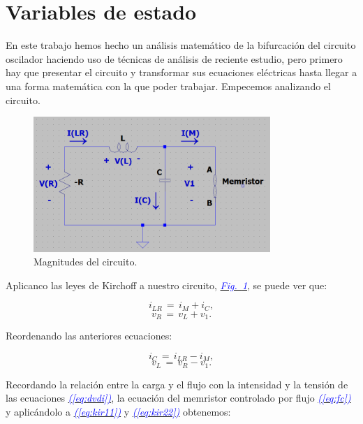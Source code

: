 \documentclass[12pt,a4paper]{report} %
\newcommand{\fref}[1]{\hyperref[#1]{\textcolor{blue}{\textit{Fig.~\ref*{#1}}}}}
\newcommand{\eref}[1]{\hyperref[#1]{\textcolor{blue}{\textit{(\ref*{#1})}}}}
\begin{document}
	\newpage
	
	\section{Variables de estado}
	\label{sec:23}
	\noindent En este trabajo hemos hecho un análisis matemático de la bifurcación del circuito oscilador haciendo uso de técnicas de análisis de reciente estudio, pero primero hay que presentar el circuito y transformar sus ecuaciones eléctricas hasta llegar a una forma matemática con la que poder trabajar. Empecemos analizando el circuito.
	
	\begin{figure}[h]
		\centering
		\includegraphics[width=0.8\textwidth]{circuito.png}
		\caption{Magnitudes del circuito.}
		\label{fig:circuito}
	\end{figure}\smallskip
	
	Aplicanco las leyes de Kirchoff a nuestro circuito, \fref{fig:circuito}, se puede ver que:
	
	\begin{equation}
		i_{LR}\,=\,i_M+i_C,
		\label{eq:kir1}
	\end{equation}
	\begin{equation}
		v_R\,=\,v_L+v_1.
		\label{eq:kir2}
	\end{equation}
	
	Reordenando las anteriores ecuaciones:
	
	\begin{equation}
		i_C\,=\,i_{LR}-i_M,
		\label{eq:kir11}
	\end{equation}
	\begin{equation}
		v_L\,=\,v_R-v_1.
		\label{eq:kir22}
	\end{equation}
	
	Recordando la relación entre la carga y el flujo con la intensidad y la tensión de las ecuaciones \eref{eq:dvdi}, la ecuación del memristor controlado por flujo \eref{eq:fc} y aplicándolo a \eref{eq:kir11} y \eref{eq:kir22} obtenemos:
	
\end{document}
